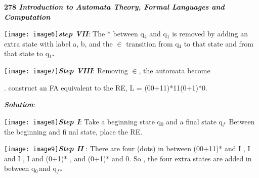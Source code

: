 \noindent \textbf{}

\noindent \textbf{}

\noindent \textbf{}

\noindent \textbf{278\textit{{\textbar}} \textit{Introduction to Automata Theory, Formal Languages and Computation }}

\noindent \texttt{[image: image6]}\textbf{\textit{step VII}}: The * between q${}_{4}$  and q${}_{1}$ is removed by adding an extra state with label a, b, and the $\mathrm{\in }$  transition from q${}_{4\ \ }$to that state and from that state to q${}_{1}$\textbf{.}

\noindent 

\noindent 

\noindent \textbf{\textit{}}

\noindent \textbf{\textit{}}

\noindent \textbf{\textit{}}

\noindent \textbf{\textit{}}

\noindent \textbf{\textit{}}

\noindent \texttt{[image: image7]}\textbf{\textit{Step VIII}}: Removing $\mathrm{\in }$, the automata become

\noindent 

\noindent 

\noindent 

\noindent 

\noindent 

\noindent 

. construct an FA equivalent to the RE, L = (00+11)*11(0+1)*0.

\noindent   \textbf{\textit{Solution}}:

\noindent \texttt{[image: image8]}\textbf{\textit{Step I}}: Take a beginning state q${}_{0}$ and a final state q${}_{f\ }$ Between the beginning and fi nal state, place the RE. 

\noindent     

\noindent 

\noindent \texttt{[image: image9]}\textbf{\textit{Step II}} : There are four (dots) in between (00+11)* and I , I and I , I and (0+1)* , and (0+1)* and 0. So , the four extra states are added in between q${}_{0\ }$and q${}_{f*}$

